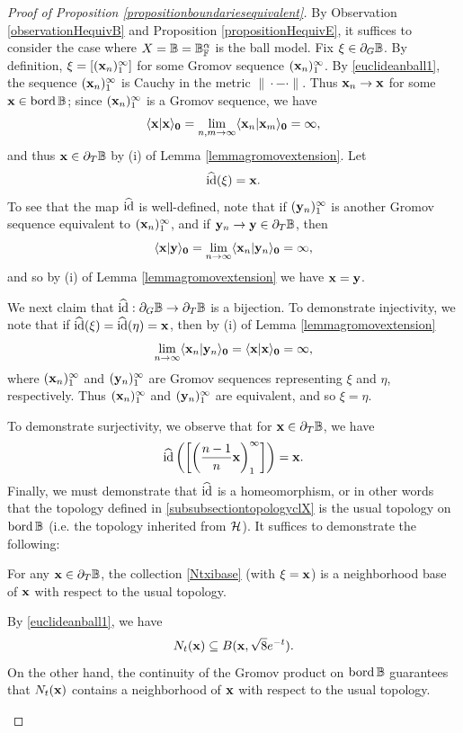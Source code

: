 \begin{proof}[Proof of Proposition \ref{propositionboundariesequivalent}]
By Observation \ref{observationHequivB} and Proposition \ref{propositionHequivE}, it suffices to consider the case where $X = \B = \B_\F^\alpha$ is the ball model. Fix $\xi\in\del_G\B$. By definition, $\xi = [(\mathbf x_n)_1^\infty]$ for some Gromov sequence $(\mathbf x_n)_1^\infty$. By \eqref{euclideanball1}, the sequence $(\mathbf x_n)_1^\infty$ is Cauchy in the metric $\|\cdot - \cdot\|$. Thus $\mathbf x_n\to\mathbf x$ for some $\xx\in\bord\B$; since $(\mathbf x_n)_1^\infty$ is a Gromov sequence, we have
\[
\langle \mathbf x|\mathbf x\rangle_\mathbf 0 = \lim_{n,m\to\infty}\langle \mathbf x_n|\mathbf x_m\rangle_\mathbf 0 = \infty,
\]
and thus $\xx\in\del_T\B$ by (i) of Lemma \ref{lemmagromovextension}. Let
\[
\widehat{\mathrm{id}}(\xi) = \mathbf x.
\]
To see that the map $\widehat{\mathrm{id}}$ is well-defined, note that if $(\mathbf y_n)_1^\infty$ is another Gromov sequence equivalent to $(\mathbf x_n)_1^\infty$, and if $\yy_n\to\yy\in\del_T \B$, then
\[
\langle \mathbf x|\mathbf y\rangle_\mathbf 0 = \lim_{n\to\infty}\langle \mathbf x_n|\mathbf y_n\rangle_\mathbf 0 = \infty,
\]
and so by (i) of Lemma \ref{lemmagromovextension} we have $\mathbf x = \mathbf y$.

We next claim that $\what\id:\del_G\B\to\del_T\B$ is a bijection. To demonstrate injectivity, we note that if $\widehat{\mathrm{id}}(\xi) = \widehat{\mathrm{id}}(\eta) = \mathbf x$, then by (i) of Lemma \ref{lemmagromovextension}
\[
\lim_{n\to\infty}\langle \mathbf x_n|\mathbf y_n\rangle_\mathbf 0 = \langle \mathbf x|\mathbf x\rangle_\mathbf 0 = \infty,
\]
where $(\mathbf x_n)_1^\infty$ and $(\mathbf y_n)_1^\infty$ are Gromov sequences representing $\xi$ and $\eta$, respectively. Thus $(\mathbf x_n)_1^\infty$ and $(\mathbf y_n)_1^\infty$ are equivalent, and so $\xi = \eta$.

To demonstrate surjectivity, we observe that for $\xx\in\del_T\B$, we have
\[
\widehat{\mathrm{id}}\left(\left[\left(\frac{n - 1}{n}\mathbf x\right)_1^\infty\right]\right) = \mathbf x.
\]
Finally, we must demonstrate that $\widehat{\mathrm{id}}$ is a homeomorphism, or in other words that the topology defined in \6\ref{subsubsectiontopologyclX} is the usual topology on $\bord\B$ (i.e. the topology inherited from $\mathcal H$). It suffices to demonstrate the following:
\begin{claim}
For any $\xx\in\del_T\B$, the collection \eqref{Ntxibase} (with $\xi = \mathbf x$) is a neighborhood base of $\mathbf x$ with respect to the usual topology.
\end{claim}
\begin{subproof}
By \eqref{euclideanball1}, we have
\[
N_t(\mathbf x) \subseteq B(\mathbf x,\sqrt 8 e^{-t}).
\]
On the other hand, the continuity of the Gromov product on $\bord\B$ guarantees that $N_t(\mathbf x)$ contains a neighborhood of $\mathbf x$ with respect to the usual topology.
\end{subproof}


\end{proof}
